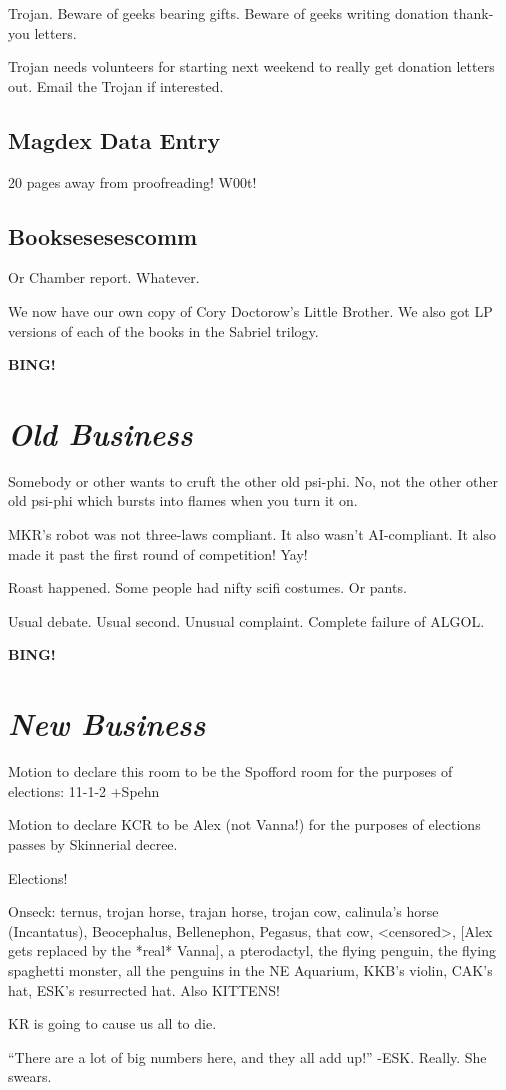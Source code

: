\documentclass[10pt]{article}
\newcommand{\bing}{{\bf BING!} }
\newcommand{\goto}[1]{\bing \vskip 12pt \section*{{\em{#1}}}}
\begin{document}
Trojan.  Beware of geeks bearing gifts.  Beware of geeks writing donation thank-you letters.

Trojan needs volunteers for starting next weekend to really get donation letters out.  Email the Trojan if interested.

\subsection{Magdex Data Entry}

20 pages away from proofreading!  W00t!

\subsection*{Booksesesescomm}

Or Chamber report.  Whatever.

We now have our own copy of Cory Doctorow's Little Brother.  We also got LP versions of each of the books in the Sabriel trilogy.

\goto{Old Business}

Somebody or other wants to cruft the other old psi-phi.  No, not the other other old psi-phi which bursts into flames when you turn it on.

MKR's robot was not three-laws compliant.  It also wasn't AI-compliant.  It also made it past the first round of competition!  Yay!

Roast happened.  Some people had nifty scifi costumes.  Or pants.

Usual debate.  Usual second.  Unusual complaint.  Complete failure of ALGOL.

\goto{New Business}

Motion to declare this room to be the Spofford room for the purposes of elections: 11-1-2 +Spehn

Motion to declare KCR to be Alex (not Vanna!) for the purposes of elections passes by Skinnerial decree.

Elections!

Onseck: ternus, trojan horse, trajan horse, trojan cow, calinula's horse (Incantatus), Beocephalus, Bellenephon, Pegasus, that cow, <censored>, [Alex gets replaced by the *real* Vanna], a pterodactyl, the flying penguin, the flying spaghetti monster, all the penguins in the NE Aquarium, KKB's violin, CAK's hat, ESK's resurrected hat.  Also KITTENS!

KR is going to cause us all to die.

``There are a lot of big numbers here, and they all add up!'' -ESK.  Really.  She swears.
\end{document}
